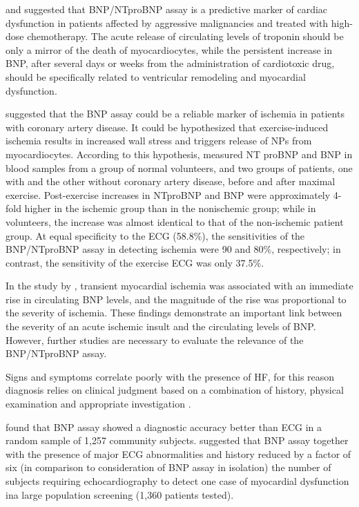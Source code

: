 \documentclass[14pt,a4paper,onecolumn]{extarticle}
\begin{document}
\citep{bib3161} and \citep{bib3162} suggested that BNP/NTproBNP assay is a predictive marker of cardiac dysfunction in patients affected by aggressive malignancies and treated with high-dose chemotherapy. The acute release of circulating levels of troponin should be only a mirror of the death of myocardiocytes, while the persistent increase in BNP, after several days or weeks from the administration of cardiotoxic drug, should be specifically related to ventricular remodeling and myocardial dysfunction.

 \citep{bib3163} \citep{bib3164} suggested that the BNP assay could be a reliable marker of ischemia in patients with coronary artery disease. It could be hypothesized that exercise-induced ischemia results in increased wall stress and triggers release of NPs from myocardiocytes. According to this hypothesis, \citep{bib3163} measured NT proBNP and BNP in blood samples from a group of normal volunteers, and two groups of patients, one with and the other without coronary artery disease, before and after maximal exercise. Post-exercise increases in NTproBNP and BNP were approximately 4-fold higher in the ischemic group than in the nonischemic group; while in volunteers, the increase was almost identical to that of the non-ischemic patient group. At equal specificity to the ECG (58.8\%), the sensitivities of the BNP/NTproBNP assay in detecting ischemia were 90 and 80\%, respectively; in contrast, the sensitivity of the exercise ECG was only 37.5\%.

In the study by \citep{bib3164}, transient myocardial ischemia was associated with an immediate rise in circulating BNP levels, and the magnitude of the rise was proportional to the severity of ischemia. These findings demonstrate an important link between the severity of an acute ischemic insult and the circulating levels of BNP. However, further studies are necessary to evaluate the relevance of the BNP/NTproBNP assay.

Signs and symptoms correlate poorly with the presence of HF, for this reason diagnosis relies on clinical judgment based on a combination of history, physical examination and appropriate investigation \citep{bib365} \citep{bib369} \citep{bib370} \citep{bib3168}.

\citep{bib392} found that BNP assay showed a diagnostic accuracy better than ECG in a random sample of 1,257 community subjects.  \citep{bib3171} suggested that BNP assay together with the presence of major ECG abnormalities and history reduced by a factor of six (in comparison to consideration of BNP assay in isolation) the number of subjects requiring echocardiography to detect one case of myocardial dysfunction ina large population screening (1,360 patients tested).
\end{document}
